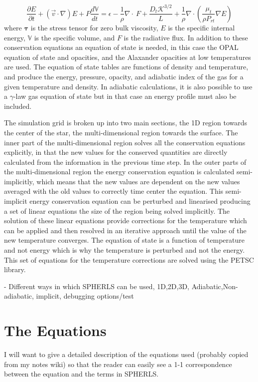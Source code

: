 \documentclass[11pt]{article}
\begin{document}
\begin{equation}
\frac{\partial E}{\partial t}+(\vec{v}\cdot\nabla)E+P\frac{d\mathbb{V}}{dt}=\epsilon-\frac{1}{\rho}\nabla\cdot\ F+\frac{D_t\mathcal{K}^{3/2}}{L}+\frac{1}{\rho}\nabla\cdot\left(\frac{\mu_t}{\rho P_{rt}}\nabla E\right)
\end{equation}
where $\mathbf{\tau}$ is the stress tensor for zero bulk viscosity, $E$ is the specific internal energy, $\mathbb{V}$ is the specific volume, and $F$ is the radiative flux. In addition to these conservation equations an equation of state is needed, in this case the OPAL equation of state and opacities, and the Alaxander opacities at low temperatures are used. The equation of state tables are functions of density and temperature, and produce the energy, pressure, opacity, and adiabatic index of the gas for a given temperature and density. In adiabatic calculations, it is also possible to use a $\gamma$-law gas equation of state but in that case an energy profile must also be included.

The simulation grid is broken up into two main sections, the 1D region towards the center of the star, the multi-dimensional region towards the surface. The inner part of the multi-dimensional region solves all the conservation equations explicitly, in that the new values for the conserved quantities are directly calculated from the information in the previous time step. In the outer parts of the multi-dimensional region the energy conservation equation is calculated semi-implicitly, which means that the new values are dependent on the new values averaged with the old values to correctly time center the equation. This semi-implicit energy conservation equation can be perturbed and linearised producing a set of linear equations the size of the region being solved implicitly. The solution of these linear equations provide corrections for the temperature which can be applied and then resolved in an iterative approach until the value of the new temperature converges. The equation of state is a function of temperature and not energy which is why the temperature is perturbed and not the energy. This set of equations for the temperature corrections are solved using the PETSC library.
  
- Different ways in which SPHERLS can be used, 1D,2D,3D, Adiabatic,Non-adiabatic, implicit, debugging options/test

\section{The Equations}
I will want to give a detailed description of the equations used (probably copied from my notes wiki) so that the reader can easily see a 1-1 correspondence between the equation and the terms in SPHERLS.
\end{document}
